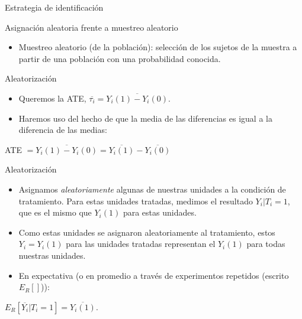 \documentclass[
  ignorenonframetext,
]{beamer}
\begin{document}
\begin{frame}{Estrategia de identificación}
\begin{frame}{Asignación aleatoria frente a muestreo aleatorio}
\begin{itemize}
  \begin{itemize}
  \item
    Esta asignación aleatoria del tratamiento puede combinarse con
    cualquier tipo de muestra (muestra aleatoria, muestra de
    conveniencia, etc.).
  \item
    Pero el tamaño y otras características de la muestra afectarán a la
    potencia y a la capacidad de extrapolar los resultados a otras
    poblaciones.
  \end{itemize}
\item
  Muestreo aleatorio (de la población): selección de los sujetos de la
  muestra a partir de una población con una probabilidad conocida.
\end{itemize}
\end{frame}

\begin{frame}{Aleatorización}
\protect\hypertarget{aleatorizaciuxf3n}{}
\begin{itemize}
\item
  Queremos la ATE, \(\overline{\tau_i}= \overline{Y_i(1)-Y_i(0)}\).
\item
  Haremos uso del hecho de que la media de las diferencias es igual a la
  diferencia de las medias:
\end{itemize}

\centering

ATE \(= \overline{Y_i(1)-Y_i(0)} = \overline{Y_i(1)}-\overline{Y_i(0)}\)
\end{frame}

\begin{frame}{Aleatorización}
\protect\hypertarget{aleatorizaciuxf3n-1}{}
\begin{itemize}
\item
  Asignamos \emph{aleatoriamente} algunas de nuestras unidades a la
  condición de tratamiento. Para estas unidades tratadas, medimos el
  resultado \(Y_i|T_i=1\), que es el mismo que \(Y_i(1)\) para estas
  unidades.
\item
  Como estas unidades se asignaron aleatoriamente al tratamiento, estos
  \(Y_i=Y_i(1)\) para las unidades tratadas representan el \(Y_i(1)\)
  para todas nuestras unidades.
\item
  En expectativa (o en promedio a través de experimentos repetidos
  (escrito \(E_R[]\))):
\end{itemize}

\centering

\(E_R[\overline{Y_i}|T_i=1]=\overline{Y_i(1)}\).


\end{frame}
\end{frame}
\end{document}

